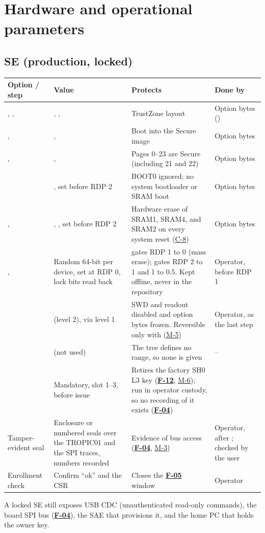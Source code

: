 \documentclass[11pt,a4paper]{article}
\newcommand{\fid}[1]{\textbf{#1}}
\begin{document}
\section{Hardware and operational parameters}\label{sec:params}

\subsection{SE (production, locked)}
\begin{longtable}{L{3.0cm}L{2.6cm}L{6.2cm}L{3.8cm}}
\toprule Option / step & Value & Protects & Done by\\ \midrule\endhead
{}, ,  & , ,  & TrustZone layout & Option bytes ()\\
,  & ,  & Boot into the Secure image & Option bytes\\
,  & ,  & Pages 0--23 are Secure (including 21 and 22) & Option bytes\\
 & , set before RDP 2 & BOOT0 ignored; no system bootloader or SRAM boot & Option bytes\\
,  & , , set before RDP 2 & Hardware erase of SRAM1, SRAM4, and SRAM2 on every system reset (\hyperref[c:C-8]{C-8}) & Option bytes\\
,  & Random 64-bit per device, set at RDP 0, lock bits read back &  gates RDP 1 to 0 (mass erase);  gates RDP 2 to 1 and 1 to 0.5. Kept offline, never in the repository & Operator, before RDP 1\\
 &  (level 2), via level 1 & SWD and readout disabled and option bytes frozen. Reversible only with  (\hyperref[m:M-5]{M-5}) & Operator, as the last step\\
 &  (not used) & The tree defines no range, so none is given & --\\
 & Mandatory, slot 1--3, before issue & Retires the factory SH0 L3 key (\hyperref[f:F-12]{\fid{F-12}}, \hyperref[m:M-6]{M-6}); run in operator custody, so no recording of it exists (\hyperref[f:F-04]{\fid{F-04}}) & \\
Tamper-evident seal & Enclosure or numbered seals over the TROPIC01 and the SPI traces, numbers recorded & Evidence of bus access (\hyperref[f:F-04]{\fid{F-04}}, \hyperref[m:M-3]{M-3}) & Operator, after ; checked by the user\\
Enrollment check & Confirm  ``ok'' and the CSR & Closes the \hyperref[f:F-05]{\fid{F-05}} window & Operator\\
\bottomrule
\end{longtable}
\noindent A locked SE still exposes USB CDC (unauthenticated read-only commands), the board SPI bus (\hyperref[f:F-04]{\fid{F-04}}), the SAE that provisions it, and the home PC that holds the owner key.
\end{document}

